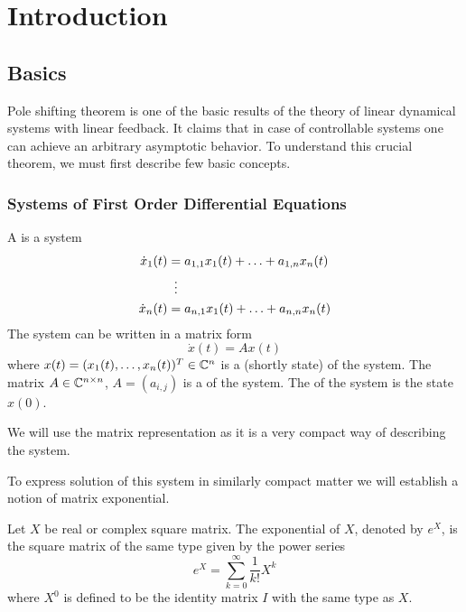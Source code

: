 \chapter{Introduction}
\label{chap:intr}

\section{Basics}
\label{sec:basics}

Pole shifting theorem is one of the basic results of the theory of linear dynamical systems with linear feedback. It claims that in case of controllable systems one can achieve an arbitrary asymptotic behavior. To understand this crucial theorem, we must first describe few basic concepts.

\subsection{Systems of First Order Differential Equations}

\begin{definition}
	A  is a system 
	\begin{align*}
		\dot{x}_1(t)&=a_{1,1}x_1(t)+\ldots+a_{1,n}x_n(t) \\
		&\vdotswithin{=} \\
		\dot{x}_n(t)&=a_{n,1}x_1(t)+\ldots+a_{n,n}x_n(t) 
	\end{align*}
	The system can be written in a matrix form $$\dot{x}(t)=Ax(t)$$ where $x(t)=(x_1(t),\ldots,x_n(t))^T \in \mathbb{C}^n$ is a  (shortly state) of the system. The matrix $A\in \mathbb{C}^{n\times n}$, $A=(a_{i,j})$ is a  of the system. The  of the system is the state $x(0)$.
\end{definition}

We will use the matrix representation as it is a very compact way of describing the system.

To express solution of this system in similarly compact matter we will establish a notion of matrix exponential.

\begin{definition}
	Let $X$ be real or complex square matrix. The exponential of $X$, denoted by $e^X$, is the square matrix of the same type given by the power series $$e^{X}=\sum _{k=0}^{\infty}\frac{1}{k!}X^{k}$$
	where $X^0$ is defined to be the identity matrix $I$ with the same type as $X$.
\end{definition}


